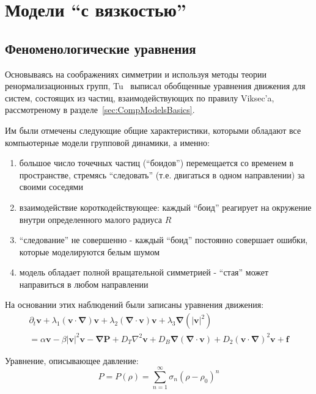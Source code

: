 \section{Модели ``с вязкостью''} %
\label{sec:ClassicalModelsWIthViscosity}
	\subsection{Феноменологические уравнения} %
	\label{sub:TonerAndTu}
		Основываясь на соображениях симметрии и используя методы теории ренормализационных групп, Tu~\cite{tu2000} выписал обобщенные уравнения движения для систем, состоящих из частиц, взаимодействующих по правилу Viksec'a, рассмотреному в разделе~\ref{sec:CompModelsBasics}. 

		Им были отмечены следующие общие характеристики, которыми обладают все компьютерные модели групповой динамики, а именно:
		\begin{enumerate}
			\item большое число точечных частиц (``боидов'') перемещается со временем в пространстве, стремясь ``следовать'' (т.е. двигаться в одном направлении) за своими соседями
			\item взаимодействие короткодействующее: каждый ``боид'' реагирует на окружение внутри определенного малого радиуса $R$
			\item ``следование'' не совершенно - каждый ``боид'' постоянно совершает ошибки, которые моделируются белым шумом
			\item модель обладает полной вращательной симметрией - ``стая'' может направиться в любом направлении
		\end{enumerate}

		На основании этих наблюдений были записаны уравнения движения:
		\begin{multline}
		\label{eq:TuEqOfMotion}
			\partial_t \boldsymbol{v} + \lambda_1(\boldsymbol{v} \cdot \boldsymbol{\nabla})\boldsymbol{v} + \lambda_2(\boldsymbol{\nabla} \cdot \boldsymbol{v})\boldsymbol{v} + \lambda_3\boldsymbol{\nabla}(|\boldsymbol{v}|^2) \\ = \alpha \boldsymbol{v} - \beta |\boldsymbol{v}|^2 \boldsymbol{v} - \boldsymbol{\nabla} \boldsymbol{P} + D_T \nabla^2 \boldsymbol{v} + D_B \boldsymbol{\nabla}(\boldsymbol{\nabla} \cdot \boldsymbol{v}) + D_2(\boldsymbol{v} \cdot \boldsymbol{\nabla})^2 \boldsymbol{v}+\boldsymbol{f}
		\end{multline}

		Уравнение, описывающее давление:
		\begin{equation}
		\label{eq:TuEqOfPressure}
			P = P(\rho) = \sum_{n=1}^\infty \sigma_n(\rho - \rho_0)^n
		\end{equation}

